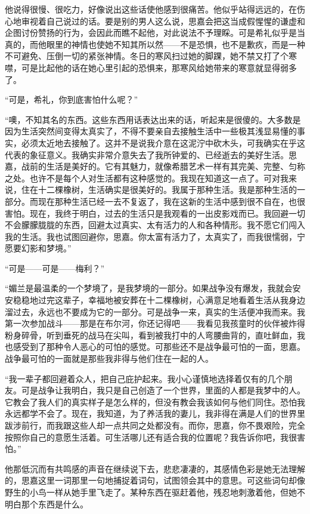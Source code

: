 \par 他说得很慢、很吃力，好像说出这些话使他感到很痛苦。他似乎站得远远的，在伤心地审视着自己说过的话。要是别的男人这么说，思嘉会把这当成假惺惺的谦虚和企图讨份赞扬的行为，会因此而瞧不起他，对此说法不予理睬。可是希礼似乎是当真的，而他眼里的神情也使她不知其所以然——不是恐惧，也不是歉疚，而是一种不可避免、压倒一切的紧张神情。冬日的寒风扫过她的脚踝，她不禁又打了个寒噤，可是比起他的话在她心里引起的恐惧来，那寒风给她带来的寒意就显得弱多了。
\par “可是，希礼，你到底害怕什么呢？”
\par “噢，不知其名的东西。这些东西用话表达出来的话，听起来是很傻的。大多数是因为生活突然间变得太真实了，不得不要亲自去接触生活中一些极其浅显易懂的事实，必须太近地去接触了。这并不是说我介意在这泥泞中砍木头，可我确实在乎这代表的象征意义。我确实非常介意失去了我所钟爱的、已经逝去的美好生活。思嘉，战前的生活是美好的。它有其魅力，就像希腊艺术一样有其完美、完整、匀称之处。也许不是每个人对生活都有这种感觉的。我现在知道这一点了。可对我来说，住在十二棵橡树，生活确实是很美好的。我属于那种生活。我是那种生活的一部分。而现在那种生活已经一去不复返了，我在这新的生活中感到很不自在，也很害怕。现在，我终于明白，过去的生活只是我观看的一出皮影戏而已。我回避一切不会朦朦胧胧的东西，回避太过真实、太有活力的人和各种情形。我不愿它们闯入我的生活。我也试图回避你，思嘉。你太富有活力了，太真实了，而我很懦弱，宁愿要幻影和梦境。”
\par “可是——可是——梅利？”
\par “媚兰是最温柔的一个梦境了，是我梦境的一部分。如果战争没有爆发，我就会安安稳稳地过完这辈子，幸福地被安葬在十二棵橡树，心满意足地看着生活从我身边溜过去，永远也不要成为它的一部分。可是战争一来，真实的生活便冲我而来。我第一次参加战斗——那是在布尔河，你还记得吧——我看见我孩童时的伙伴被炸得粉身碎骨，听到垂死的战马在尖叫，看到被我打中的人弯腰曲背的，直吐鲜血，我也感受到了那种令人恶心的可怕的感觉。可那些还不是战争最可怕的一面，思嘉。战争最可怕的一面就是那些我非得与他们住在一起的人。
\par “我一辈子都回避着众人，把自己庇护起来。我小心谨慎地选择着仅有的几个朋友。可是战争让我明白，我只是自己创造了一个世界，里面的人都是我梦中的人。它教会了我人们的真实样子是怎么样的，但没有教会我该如何与他们同住。恐怕我永远都学不会了。现在，我知道，为了养活我的妻儿，我非得在满是人们的世界里跋涉前行，而我跟这些人却一点共同之处都没有。而你，思嘉，你不畏艰险，完全按照你自己的意愿生活着。可生活哪儿还有适合我的位置呢？我告诉你吧，我很害怕。”
\par 他那低沉而有共鸣感的声音在继续说下去，悲悲凄凄的，其感情色彩是她无法理解的，思嘉这里一词那里一句地捕捉着词句，试图领会其中的意思。可这些词句却像野生的小鸟一样从她手里飞走了。某种东西在驱赶着他，残忍地刺激着他，但她不明白那个东西是什么。
